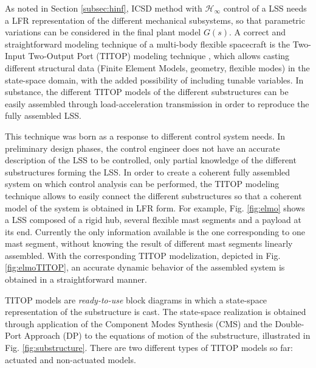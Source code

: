 \documentclass{ifacconf}
\begin{document}
As noted in Section \ref{subsec:hinf}, ICSD method with $\mathcal{H}_\infty$ control of a LSS needs a LFR representation of the different mechanical subsystems, so that parametric variations can be considered in the final plant model $G(s)$. A correct and straightforward modeling technique of a multi-body flexible spacecraft is the Two-Input Two-Output Port (TITOP) modeling technique \citep{Perez2015_LM, Alazard2015_LM, perez_IFAtheory2015, perez_IFAapply2015}, which allows casting different structural data (Finite Element Models, geometry, flexible modes) in the state-space domain, with the added possibility of including tunable variables. In substance, the different TITOP models of the different substructures can be easily assembled through load-acceleration transmission in order to reproduce the fully assembled LSS. 

This technique was born as a response to different control system needs. In preliminary design phases, the control engineer does not have an accurate description of the LSS to be controlled, only partial knowledge of the different substructures forming the LSS. In order to create a coherent fully assembled system on which control analysis can be performed, the TITOP modeling technique allows to easily connect the different substructures so that a coherent model of the system is obtained in LFR form. For example, Fig. \ref{fig:elmo} shows a LSS composed of a rigid hub, several flexible mast segments and a payload at its end. Currently the only information available is the one corresponding to one mast segment, without knowing the result of different mast segments linearly assembled. With the corresponding TITOP modelization, depicted in Fig. \ref{fig:elmoTITOP}, an accurate dynamic behavior of the assembled system is obtained in a straightforward manner.

TITOP models are \textit{ready-to-use} block diagrams in which a state-space representation of the substructure is cast. The state-space realization is obtained through application of the Component Modes Synthesis (CMS) \citep{Hurty1965_CM} and the Double-Port Approach (DP) \citep{Alazard2015_LM} to the equations of motion of the substructure, illustrated in Fig. \ref{fig:substructure}. There are two different types of TITOP models so far: actuated and non-actuated models.
\end{document}
